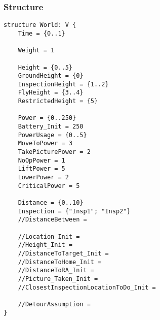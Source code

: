 \documentclass[12pt]{extarticle}
\begin{document}
\subsubsection*{Structure}
\begin{lstlisting}[basicstyle=\tiny]
structure World: V {
    Time = {0..1}
    
    Weight = 1
    
    Height = {0..5}
    GroundHeight = {0}
    InspectionHeight = {1..2}
    FlyHeight = {3..4}
    RestrictedHeight = {5}
    
    Power = {0..250}
    Battery_Init = 250
    PowerUsage = {0..5}
    MoveToPower = 3
    TakePicturePower = 2
    NoOpPower = 1
    LiftPower = 5
    LowerPower = 2
    CriticalPower = 5
    
    Distance = {0..10}
    Inspection = {"Insp1"; "Insp2"}
    //DistanceBetween =

    //Location_Init =
    //Height_Init = 
    //DistanceToTarget_Init =
    //DistanceToHome_Init =
    //DistanceToRA_Init =
    //Picture_Taken_Init =
    //ClosestInspectionLocationToDo_Init =
    
    //DetourAssumption =
}
\end{lstlisting}
\end{document}
